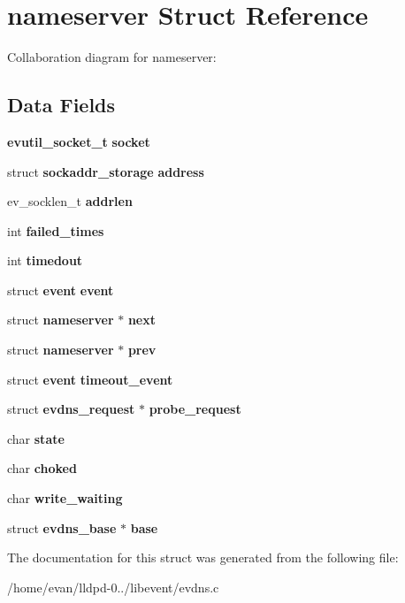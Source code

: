 \section{nameserver \-Struct \-Reference}
\label{structnameserver}


\-Collaboration diagram for nameserver\-:
\subsection*{\-Data \-Fields}
\begin{DoxyCompactItemize}
\item 
{\bf evutil\-\_\-socket\-\_\-t} {\bfseries socket}\label{structnameserver_a494e928d7ad4d9e91908c0a553b7bdd9}

\item 
struct {\bf sockaddr\-\_\-storage} {\bfseries address}\label{structnameserver_aae8fde91ce26bf141fe1d113e5c895fb}

\item 
ev\-\_\-socklen\-\_\-t {\bfseries addrlen}\label{structnameserver_a6880b3fcdc638f79016883fc28654a04}

\item 
int {\bfseries failed\-\_\-times}\label{structnameserver_a5e547092382a90de1f1bb0dc063c4379}

\item 
int {\bfseries timedout}\label{structnameserver_a2119968b0a603dbd8ab9ea2b672196fc}

\item 
struct {\bf event} {\bfseries event}\label{structnameserver_a1865896e0bd37f9af1e926d9ba93c9dd}

\item 
struct {\bf nameserver} $\ast$ {\bfseries next}\label{structnameserver_a13194c159b2b647817aaad848bfa04e3}

\item 
struct {\bf nameserver} $\ast$ {\bfseries prev}\label{structnameserver_ac36a8c14cbd69ae5563a4f7d488bf6ba}

\item 
struct {\bf event} {\bfseries timeout\-\_\-event}\label{structnameserver_aa2277fcb92b9a06b28d65f3d638ed474}

\item 
struct {\bf evdns\-\_\-request} $\ast$ {\bfseries probe\-\_\-request}\label{structnameserver_a9618caa7125a09384128c2915a8cf4c9}

\item 
char {\bfseries state}\label{structnameserver_afc09df66e4e1131bad27f84d29bd8726}

\item 
char {\bfseries choked}\label{structnameserver_a0f3a154587df2dea392d065f8a09b280}

\item 
char {\bfseries write\-\_\-waiting}\label{structnameserver_a1d015cac3cd6d638739e4d4264d01588}

\item 
struct {\bf evdns\-\_\-base} $\ast$ {\bfseries base}\label{structnameserver_a9284dcea4dc075146973bbcd063de32f}

\end{DoxyCompactItemize}


\-The documentation for this struct was generated from the following file\-:\begin{DoxyCompactItemize}
\item 
/home/evan/lldpd-\/0../libevent/evdns.\-c\end{DoxyCompactItemize}
